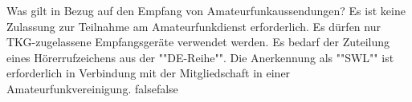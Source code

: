     {Was gilt in Bezug auf den Empfang von Amateurfunkaussendungen?}
    {Es ist keine Zulassung zur Teilnahme am Amateurfunkdienst erforderlich.}
    {Es dürfen nur TKG-zugelassene Empfangsgeräte verwendet werden.}
    {Es bedarf der Zuteilung eines Hörerrufzeichens aus der ""DE-Reihe"".}
    {Die Anerkennung als ""SWL"" ist erforderlich in Verbindung mit der Mitgliedschaft in einer Amateurfunkvereinigung.}
    {false}{false}